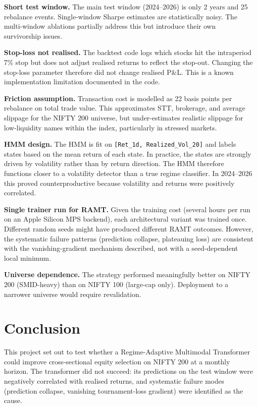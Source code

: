 \documentclass[conference]{IEEEtran}
\begin{document}
\textbf{Short test window.} The main test window (2024--2026) is only 2 years and 25 rebalance events. Single-window Sharpe estimates are statistically noisy. The multi-window ablations partially address this but introduce their own survivorship issues.

\textbf{Stop-loss not realised.} The backtest code logs which stocks hit the intraperiod 7\% stop but does not adjust realised returns to reflect the stop-out. Changing the stop-loss parameter therefore did not change realised P\&L. This is a known implementation limitation documented in the code.

\textbf{Friction assumption.} Transaction cost is modelled as 22 basis points per rebalance on total trade value. This approximates STT, brokerage, and average slippage for the NIFTY 200 universe, but under-estimates realistic slippage for low-liquidity names within the index, particularly in stressed markets.

\textbf{HMM design.} The HMM is fit on \texttt{[Ret\_1d, Realized\_Vol\_20]} and labels states based on the mean return of each state. In practice, the states are strongly driven by volatility rather than by return direction. The HMM therefore functions closer to a volatility detector than a true regime classifier. In 2024--2026 this proved counterproductive because volatility and returns were positively correlated.

\textbf{Single trainer run for RAMT.} Given the training cost (several hours per run on an Apple Silicon MPS backend), each architectural variant was trained once. Different random seeds might have produced different RAMT outcomes. However, the systematic failure patterns (prediction collapse, plateauing loss) are consistent with the vanishing-gradient mechanism described, not with a seed-dependent local minimum.

\textbf{Universe dependence.} The strategy performed meaningfully better on NIFTY 200 (SMID-heavy) than on NIFTY 100 (large-cap only). Deployment to a narrower universe would require revalidation.

\section{Conclusion}

This project set out to test whether a Regime-Adaptive Multimodal Transformer could improve cross-sectional equity selection on NIFTY 200 at a monthly horizon. The transformer did not succeed: its predictions on the test window were negatively correlated with realised returns, and systematic failure modes (prediction collapse, vanishing tournament-loss gradient) were identified as the cause.
\end{document}
